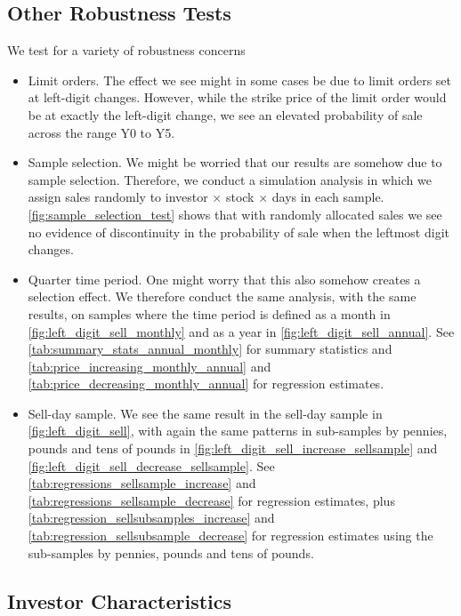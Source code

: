\subsection{Other Robustness Tests}

We test for a variety of robustness concerns
\begin{itemize}
	\item Limit orders. The effect we see might in some cases be due to limit orders set at left-digit changes. However, while the strike price of the limit order would be at exactly the left-digit change, we see an elevated probability of sale across the range Y0 to Y5.
	\item Sample selection. We might be worried that our results are somehow due to sample selection. Therefore, we conduct a simulation analysis in which we assign sales randomly to investor $\times$ stock $\times$ days in each sample. \ref{fig:sample_selection_test} shows that with randomly allocated sales we see no evidence of discontinuity in the probability of sale when the leftmost digit changes.
	\item Quarter time period. One might worry that this also somehow creates a selection effect. We therefore conduct the same analysis, with the same results, on samples where the time period is defined as a month in \ref{fig:left_digit_sell_monthly} and as a year in \ref{fig:left_digit_sell_annual}. See \ref{tab:summary_stats_annual_monthly} for summary statistics and \ref{tab:price_increasing_monthly_annual} and \ref{tab:price_decreasing_monthly_annual} for regression estimates.
	\item Sell-day sample. We see the same result in the sell-day sample in \ref{fig:left_digit_sell}, with again the same patterns in sub-samples by pennies, pounds and tens of pounds in \ref{fig:left_digit_sell_increase_sellsample} and \ref{fig:left_digit_sell_decrease_sellsample}. See \ref{tab:regressions_sellsample_increase} and \ref{tab:regressions_sellsample_decrease} for regression estimates, plus \ref{tab:regression_sellsubsamples_increase} and \ref{tab:regression_sellsubsample_decrease} for regression estimates using the sub-samples by pennies, pounds and tens of pounds.
\end{itemize}

\subsection{Investor Characteristics} 

